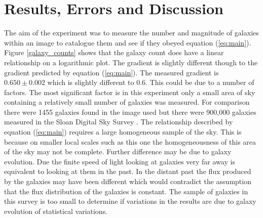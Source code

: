 \documentclass[10pt,a4paper]{article}
\begin{document}
\section*{Results, Errors and Discussion}
The aim of the experiment was to measure the number and magnitude of galaxies within an image to catalogue them and see if they obeyed equation (\ref{eq:main}). Figure \ref{galaxy_counts} shows that the galaxy count does have a linear relationship on a logarithmic plot. The gradient is slightly different though to the gradient predicted by equation (\ref{eq:main}). The measured gradient is $0.650 \pm 0.002$ which is slightly different to 0.6. This could be due to a number of factors. The most significant factor is in this experiment only a small area of sky containing a relatively small number of galaxies was measured. For comparison there were 1455 galaxies found in the image used but there were 900,000 galaxies measured in the Sloan Digital Sky Survey \cite{paper}. The relationship described by equation (\ref{eq:main}) requires a large homogeneous sample of the sky. This is because on smaller local scales such as this one the homogeneousness of this area of the sky may not be complete. Further difference may be due to galaxy evolution. Due the finite speed of light looking at galaxies very far away is equivalent to looking at them in the past. In the distant past the flux produced by the galaxies may have been different which would contradict the assumption that the flux distribution of the galaxies is constant. The sample of galaxies in this survey is too small to determine if variations in the results are due to galaxy evolution of statistical variations.
\end{document}

